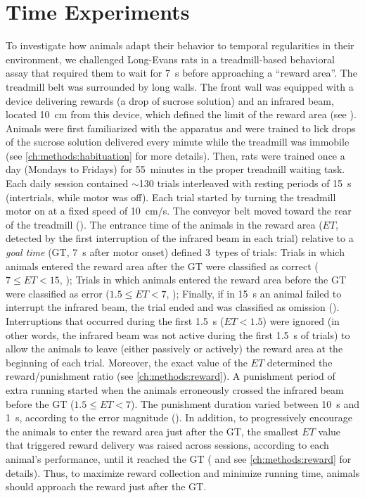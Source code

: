 \chapter{Time Experiments} \label{ch:time}

To investigate how animals adapt their behavior to temporal regularities in their environment, we challenged Long-Evans rats in a treadmill-based behavioral assay that required them to wait for 7~s before approaching a ``reward area''.\footnotemark
{}
The treadmill belt was surrounded by long walls.
The front wall was equipped with a device delivering rewards (a drop of sucrose solution) and an infrared beam, located 10~cm from this device, which defined the limit of the reward area (see ).
Animals were first familiarized with the apparatus and were trained to lick drops of the sucrose solution delivered every minute while the treadmill was immobile (see \autoref{ch:methods:habituation} for more details).
Then, rats were trained once a day (Mondays to Fridays) for 55~minutes in the proper treadmill waiting task.
Each daily session contained $\sim$130 trials interleaved with resting periods of 15~s (intertrials, while motor was off).
Each trial started by turning the treadmill motor on at a fixed speed of 10~cm/s.
The conveyor belt moved toward the rear of the treadmill ().
The entrance time of the animals in the reward area ($ET$, detected by the first interruption of the infrared beam in each trial) relative to a \emph{goal time} (GT, 7~s after motor onset) defined 3~types of trials:
    Trials in which animals entered the reward area after the GT were classified as correct ($7\leq ET<15$, );
    Trials in which animals entered the reward area before the GT were classified as error ($1.5\leq ET<7$, );
    Finally, if in 15~s an animal failed to interrupt the infrared beam, the trial ended and was classified as omission ().
Interruptions that occurred during the first 1.5~s ($ET<1.5$) were ignored (in other words, the infrared beam was not active during the first 1.5~s of trials) to allow the animals to leave (either passively or actively) the reward area at the beginning of each trial.
Moreover, the exact value of the $ET$ determined the reward/punishment ratio (see \autoref{ch:methods:reward}).
A punishment period of extra running started when the animals erroneously crossed the infrared beam before the GT ($1.5\leq ET<7$).
The punishment duration varied between 10~s and 1~s, according to the error magnitude ().
In addition, to progressively encourage the animals to enter the reward area just after the GT, the smallest $ET$ value that triggered reward delivery was raised across sessions, according to each animal's performance, until it reached the GT ( and see \autoref{ch:methods:reward} for details).
Thus, to maximize reward collection and minimize running time, animals should approach the reward just after the GT.

